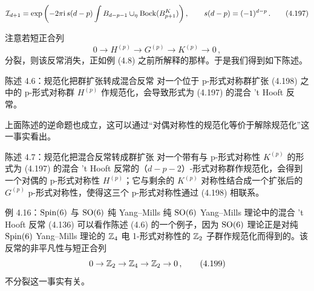 \begin{equation}
  \mathcal{I}_{d+1}=\exp\left(-2\pi\mathrm{i}\,s(d-p)\int B_{d-p-1}\cup_\eta \mathrm{Bock}(B^K_{p+1})\right),\qquad s(d-p)=(-1)^{d-p}\,. \tag{4.197}
\end{equation}



注意若短正合列
\begin{equation}
  0\to H^{(p)}\to G^{(p)}\to K^{(p)}\to 0\,, \tag{4.198}
\end{equation}
分裂，则该反常消失，正如例 (4.8) 之前所解释的那样。于是我们得到如下陈述。

\begin{statementbox}{陈述 4.6：规范化把群扩张转成混合反常}
对一个位于 p-形式对称群扩张 (4.198) 之中的 p-形式对称群 $H^{(p)}$ 作规范化，会导致形式为 (4.197) 的混合 't Hooft 反常。
\end{statementbox}

上面陈述的逆命题也成立，这可以通过“对偶对称性的规范化等价于解除规范化”这一事实看出。

\begin{statementbox}{陈述 4.7：规范化把混合反常转成群扩张}
对一个带有与 p-形式对称性 $K^{(p)}$ 的形式为 (4.197) 的混合 't Hooft 反常的（$d-p-2$）-形式对称群作规范化，会得到一个对偶的 p-形式对称性 $H^{(p)}$；它与剩余的 $K^{(p)}$ 对称性结合成一个扩张后的 $G^{(p)}$ p-形式对称性，使得这三个 p-形式对称性通过 (4.198) 相联系。
\end{statementbox}

\begin{examplebox}{例 4.16：$\mathrm{Spin}(6)$ 与 $\mathrm{SO}(6)$ 纯 Yang--Mills}
纯 $\mathrm{SO}(6)$ Yang--Mills 理论中的混合 't Hooft 反常 (4.136) 可以看作陈述 (4.6) 的一个例子，因为 $\mathrm{SO}(6)$ 理论正是对纯 $\mathrm{Spin}(6)$ Yang--Mills 理论的 $\mathbb{Z}_4$ 电 1-形式对称性的 $\mathbb{Z}_2$ 子群作规范化而得到的。该反常的非平凡性与短正合列
\begin{equation}
  0\to\mathbb{Z}_2\to\mathbb{Z}_4\to\mathbb{Z}_2\to 0\,, \tag{4.199}
\end{equation}
不分裂这一事实有关。
\end{examplebox}


